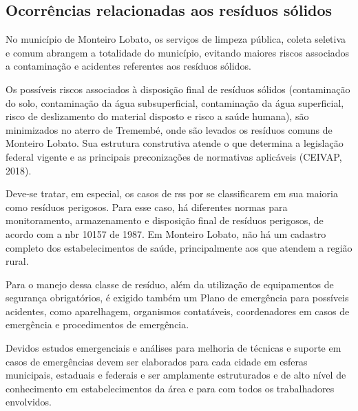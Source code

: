 	\subsection{Ocorrências relacionadas aos resíduos sólidos}
	No município de Monteiro Lobato, os serviços de limpeza pública, coleta seletiva e comum abrangem a totalidade do município, evitando maiores riscos associados a contaminação e acidentes referentes aos resíduos sólidos.

	Os possíveis riscos associados à disposição final de resíduos sólidos (contaminação do solo, contaminação da água subsuperficial, contaminação da água superficial, risco de deslizamento do material disposto e risco a saúde humana), são minimizados no aterro de Tremembé, onde são levados os resíduos comuns de Monteiro Lobato. Sua estrutura construtiva atende o que determina a legislação federal vigente e as principais preconizações de normativas aplicáveis (CEIVAP, 2018).

	Deve-se tratar, em especial, os casos de \gls{rss} por se classificarem em sua maioria como resíduos perigosos. Para esse caso, há diferentes normas para monitoramento, armazenamento e disposição final de resíduos perigosos, de acordo com a \gls{nbr} 10157 de 1987. Em Monteiro Lobato, não há um cadastro completo dos estabelecimentos de saúde, principalmente aos que atendem a região rural.

	Para o manejo dessa classe de resíduo, além da utilização de equipamentos de segurança obrigatórios, é exigido também um Plano de emergência para possíveis acidentes, como aparelhagem, organismos contatáveis, coordenadores em casos de emergência e procedimentos de emergência.

	Devidos estudos emergenciais e análises para melhoria de técnicas e suporte em casos de emergências devem ser elaborados para cada cidade em esferas municipais, estaduais e federais e ser amplamente estruturados e de alto nível de conhecimento em estabelecimentos da área e para com todos os trabalhadores envolvidos.

